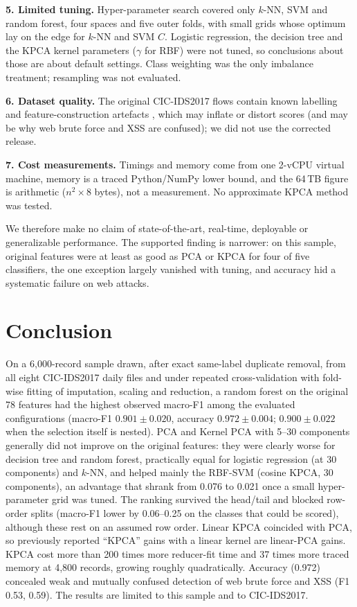 \documentclass[conference]{IEEEtran}
\begin{document}
\textbf{5. Limited tuning.} Hyper-parameter search covered only $k$-NN, SVM and random forest, four spaces and five outer folds, with small grids whose optimum lay on the edge for $k$-NN and SVM $C$. Logistic regression, the decision tree and the KPCA kernel parameters ($\gamma$ for RBF) were not tuned, so conclusions about those are about default settings. Class weighting was the only imbalance treatment; resampling was not evaluated.

\textbf{6. Dataset quality.} The original CIC-IDS2017 flows contain known labelling and feature-construction artefacts \cite{engelen2021}, which may inflate or distort scores (and may be why web brute force and XSS are confused); we did not use the corrected release.

\textbf{7. Cost measurements.} Timings and memory come from one 2-vCPU virtual machine, memory is a traced Python/NumPy lower bound, and the 64\,TB figure is arithmetic ($n^2\times8$ bytes), not a measurement. No approximate KPCA method was tested.

We therefore make no claim of state-of-the-art, real-time, deployable or generalizable performance. The supported finding is narrower: on this sample, original features were at least as good as PCA or KPCA for four of five classifiers, the one exception largely vanished with tuning, and accuracy hid a systematic failure on web attacks.

\section{Conclusion}
On a 6{,}000-record sample drawn, after exact same-label duplicate removal, from all eight CIC-IDS2017 daily files and under repeated cross-validation with fold-wise fitting of imputation, scaling and reduction, a random forest on the original 78 features had the highest observed macro-F1 among the evaluated configurations (macro-F1 $0.901\pm0.020$, accuracy $0.972\pm0.004$; $0.900\pm0.022$ when the selection itself is nested). PCA and Kernel PCA with 5--30 components generally did not improve on the original features: they were clearly worse for decision tree and random forest, practically equal for logistic regression (at 30 components) and $k$-NN, and helped mainly the RBF-SVM (cosine KPCA, 30 components), an advantage that shrank from 0.076 to 0.021 once a small hyper-parameter grid was tuned. The ranking survived the head/tail and blocked row-order splits (macro-F1 lower by 0.06--0.25 on the classes that could be scored), although these rest on an assumed row order. Linear KPCA coincided with PCA, so previously reported ``KPCA'' gains with a linear kernel are linear-PCA gains. KPCA cost more than 200 times more reducer-fit time and 37 times more traced memory at 4{,}800 records, growing roughly quadratically. Accuracy (0.972) concealed weak and mutually confused detection of web brute force and XSS (F1 0.53, 0.59). The results are limited to this sample and to CIC-IDS2017.
\end{document}
